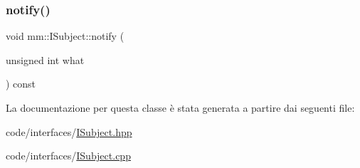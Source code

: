 \subsubsection{\texorpdfstring{notify()}{notify()}\hspace{0.1cm}{\footnotesize\ttfamily [2/2]}}
{\footnotesize\ttfamily void mm\+::\+I\+Subject\+::notify (\begin{DoxyParamCaption}\item[{unsigned int}]{what }\end{DoxyParamCaption}) const}



La documentazione per questa classe è stata generata a partire dai seguenti file\+:\begin{DoxyCompactItemize}
\item 
code/interfaces/\mbox{\hyperlink{_i_subject_8hpp}{I\+Subject.\+hpp}}\item 
code/interfaces/\mbox{\hyperlink{_i_subject_8cpp}{I\+Subject.\+cpp}}\end{DoxyCompactItemize}
